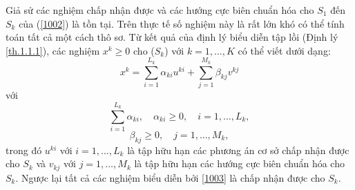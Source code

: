 Giả sử các nghiệm chấp nhận được và các hướng cực biên chuẩn hóa cho $S_1$ đến $S_k$ của (\ref{1002}) là tồn tại. Trên thực tế số nghiệm này là rất lớn khó có thể tính toán tất cả một cách thô sơ. Từ kết quả của định lý biểu diễn tập lồi (Định lý \ref{th.1.1.1}), các nghiệm $x^k\geq0$ cho ($S_k$) với $k=1,\dots,K$ có thể viết dưới dạng:
\begin{displaymath}\label{1003}
x^k=\sum_{i=1}^{L_k}\alpha_{ki}u^{ki}+\sum_{j=1}^{M_k}\beta_{kj}v^{kj}
\end{displaymath}
với
\begin{displaymath}\label{1004}
\sum_{i=1}^{L_k}\alpha_{ki},\quad \alpha_{ki}\geq0,\quad i=1,\dots,L_k,
\end{displaymath}
\begin{displaymath}\label{1005}
\beta_{kj}\geq0,\quad j=1,\dots,M_k,
\end{displaymath}
trong đó $u^{ki}$ với $i=1,\dots,L_k$ là tập hữu hạn các phương án cơ sở chấp nhận được cho $S_k$ và $v_{kj}$ với $j=1,\dots,M_k$ là tập hữu hạn các hướng cực biên chuẩn hóa cho $S_k$. Ngược lại tất cả các nghiệm biểu diễn bởi \eqref{1003} là chấp nhận được cho $S_k$.

